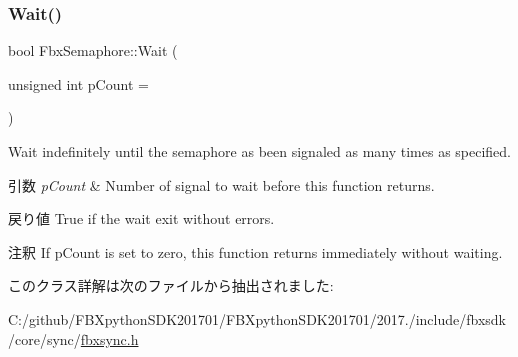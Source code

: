 \subsubsection{\texorpdfstring{Wait()}{Wait()}}
{\footnotesize\ttfamily bool Fbx\+Semaphore\+::\+Wait (\begin{DoxyParamCaption}\item[{unsigned int}]{p\+Count = {} }\end{DoxyParamCaption})}

Wait indefinitely until the semaphore as been signaled as many times as specified. 
\begin{DoxyParams}{引数}
{\em p\+Count} & Number of signal to wait before this function returns. \\
\hline
\end{DoxyParams}
\begin{DoxyReturn}{戻り値}
True if the wait exit without errors. 
\end{DoxyReturn}
\begin{DoxyRemark}{注釈}
If p\+Count is set to zero, this function returns immediately without waiting. 
\end{DoxyRemark}


このクラス詳解は次のファイルから抽出されました\+:\begin{DoxyCompactItemize}
\item 
C\+:/github/\+F\+B\+Xpython\+S\+D\+K201701/\+F\+B\+Xpython\+S\+D\+K201701/2017./include/fbxsdk/core/sync/\hyperlink{fbxsync_8h}{fbxsync.\+h}\end{DoxyCompactItemize}
